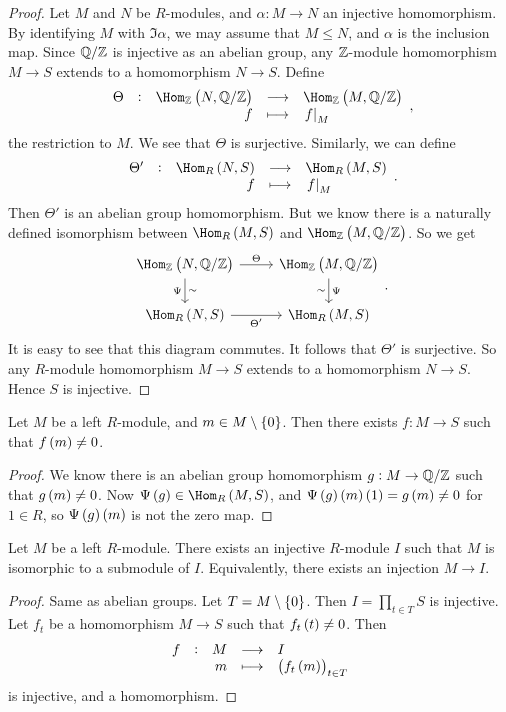 \begin{proof}
Let $ M $ and $ N $ be $ R $-modules, and $ \alpha : M \to N $ an injective homomorphism. By identifying $ M $ with $ \Im \alpha $, we may assume that $ M \le N $, and $ \alpha $ is the inclusion map. Since $ \mathbb{Q} / \mathbb{Z} $ is injective as an abelian group, any $ \mathbb{Z} $-module homomorphism $ M \to S $ extends to a homomorphism $ N \to S $. Define
$$ \function[\Theta]{\Hom_\ZZ\br{N, \QQ / \ZZ}}{\Hom_\ZZ\br{M, \QQ / \ZZ}}{f}{\eval{f}_M}, $$
the restriction to $ M $. We see that $ \Theta $ is surjective. Similarly, we can define
$$ \function[\Theta']{\Hom_R\br{N, S}}{\Hom_R\br{M, S}}{f}{\eval{f}_M}. $$
Then $ \Theta' $ is an abelian group homomorphism. But we know there is a naturally defined isomorphism between $ \Hom_R\br{M, S} $ and $ \Hom_\ZZ\br{M, \QQ / \ZZ} $. So we get
$$
\begin{tikzcd}
\Hom_\ZZ\br{N, \QQ / \ZZ} \arrow{r}{\Theta} \arrow{d}{\sim}[swap]{\Psi} & \Hom_\ZZ\br{M, \QQ / \ZZ} \arrow{d}{\Psi}[swap]{\sim} \\
\Hom_R\br{N, S} \arrow[swap]{r}{\Theta'} & \Hom_R\br{M, S}
\end{tikzcd}.
$$
It is easy to see that this diagram commutes. It follows that $ \Theta' $ is surjective. So any $ R $-module homomorphism $ M \to S $ extends to a homomorphism $ N \to S $. Hence $ S $ is injective.
\end{proof}

\pagebreak

\begin{proposition}
Let $ M $ be a left $ R $-module, and $ m \in M \setminus \cbr{0} $. Then there exists $ f : M \to S $ such that $ f\br{m} \ne 0 $.
\end{proposition}

\begin{proof}
We know there is an abelian group homomorphism $ g : M \to \mathbb{Q} / \mathbb{Z} $ such that $ g\br{m} \ne 0 $. Now $ \Psi\br{g} \in \Hom_R\br{M, S} $, and $ \Psi\br{g}\br{m}\br{1} = g\br{m} \ne 0 $ for $ 1 \in R $, so $ \Psi\br{g}\br{m} $ is not the zero map.
\end{proof}

\begin{proposition}
Let $ M $ be a left $ R $-module. There exists an injective $ R $-module $ I $ such that $ M $ is isomorphic to a submodule of $ I $. Equivalently, there exists an injection $ M \to I $.
\end{proposition}

\begin{proof}
Same as abelian groups. Let $ T = M \setminus \cbr{0} $. Then $ I = \prod_{t \in T} S $ is injective. Let $ f_t $ be a homomorphism $ M \to S $ such that $ f_t\br{t} \ne 0 $. Then
$$ \function[f]{M}{I}{m}{\br{f_t\br{m}}_{t \in T}} $$
is injective, and a homomorphism.
\end{proof}


